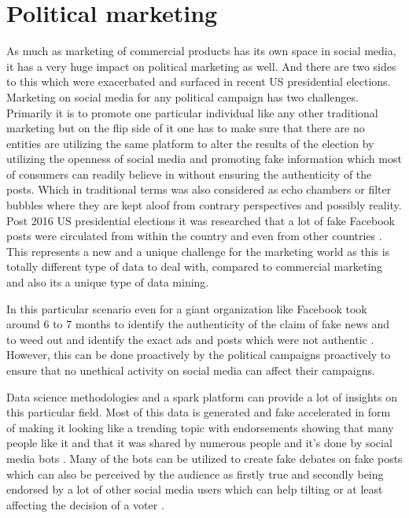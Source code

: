 \documentclass[sigconf]{acmart}
\begin{document}
\section{Political marketing}
As much as marketing of commercial products has its own space in social media, it has a very huge impact on political marketing as well. And there are two sides to this which were exacerbated and surfaced in recent US presidential elections. Marketing on social media for any political campaign has two challenges. Primarily it is to promote one particular individual like any other traditional marketing but on the flip side of it one has to make sure that there are no entities are utilizing the same platform to alter the results of the election by utilizing the openness of social media and promoting fake information which most of consumers can readily believe in without ensuring the authenticity of the posts. Which in traditional terms was also considered as echo chambers or filter bubbles where they are kept aloof from contrary perspectives and possibly reality. Post 2016 US presidential elections it was researched that a lot of fake Facebook posts were circulated from within the country and even from other countries \cite{NBERw23089} \cite{fbuselection}. This represents a new and a unique challenge for the marketing world as this is totally different type of data to deal with, compared to commercial marketing and also its a unique type of data mining.

In this particular scenario even for a giant organization like Facebook took around 6 to 7 months to identify the authenticity of the claim of fake news and to weed out and identify the exact ads and posts which were not authentic \cite{fbuselection2}. However, this can be done proactively by the political campaigns proactively to ensure that no unethical activity on social media can affect their campaigns.

Data science methodologies and a spark platform can provide a lot of insights on this particular field. Most of this data is generated and fake accelerated in form of making it looking like a trending topic with endorsements showing that many people like it and that it was shared by numerous people and it's done by social media bots \cite{Lilian2013srep}. Many of the bots can be utilized to create fake debates on fake posts which can also be perceived by the audience as firstly true and secondly being endorsed by a lot of other social media users which can help tilting or at least affecting the decision of a voter \cite{andrejz}.
\end{document}
